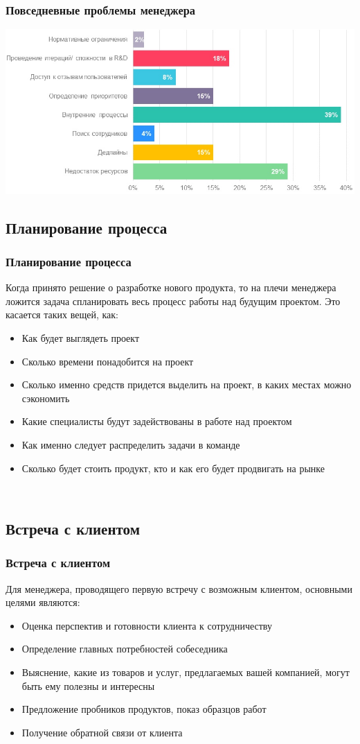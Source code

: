 \documentclass{../industrial-development}
\begin{document}
{\begin{frame} \frametitle{Повседневные проблемы менеджера}
{\includegraphics[width=1\linewidth]{problem.png}}
\end{frame}
\lecturenotes

\subsection{Планирование процесса}
\begin{frame} \frametitle{Планирование процесса}
Когда принято решение о разработке нового продукта, то на плечи менеджера ложится задача спланировать весь процесс работы над будущим проектом. Это касается таких вещей, как:
\begin{itemize}	
		\item Как будет выглядеть проект
		\item Сколько времени понадобится на проект
	 	\item Сколько именно средств придется выделить на проект, в каких местах можно сэкономить
	 	\item Какие специалисты будут задействованы в работе над проектом
		\item Как именно следует распределить задачи в команде
	 	\item Сколько будет стоить продукт, кто и как его будет продвигать на рынке

 \end{itemize}
\end{frame}
\lecturenotes

~\cite{How_to_be_a_good_IT-manager}

\subsection{Встреча с клиентом}
\begin{frame} \frametitle{Встреча с клиентом}
Для менеджера, проводящего первую встречу с возможным клиентом, основными целями являются:
\begin{itemize}	
		\item Оценка перспектив и готовности клиента к сотрудничеству
		\item Определение главных потребностей собеседника
	 	\item Выяснение, какие из товаров и услуг, предлагаемых вашей компанией, могут быть ему полезны и интересны
	 	\item Предложение пробников продуктов, показ образцов работ
		\item Получение обратной связи от клиента


\end{itemize}
\end{frame}}
\end{document}
